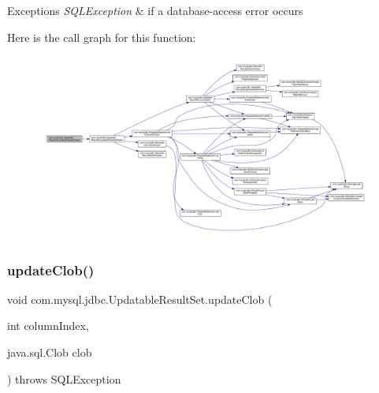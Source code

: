 \begin{DoxyExceptions}{Exceptions}
{\em S\+Q\+L\+Exception} & if a database-\/access error occurs \\
\hline
\end{DoxyExceptions}
Here is the call graph for this function\+:
\nopagebreak
\begin{figure}[H]
\begin{center}
\leavevmode
\includegraphics[width=350pt]{classcom_1_1mysql_1_1jdbc_1_1_updatable_result_set_aa40ad5cf67142d3dc3e3842fc16cda26_cgraph}
\end{center}
\end{figure}
\mbox{\label{classcom_1_1mysql_1_1jdbc_1_1_updatable_result_set_adc60deda2d478d5978e684d6efc77e4b}} 
\subsubsection{\texorpdfstring{update\+Clob()}{updateClob()}}
{\footnotesize\ttfamily void com.\+mysql.\+jdbc.\+Updatable\+Result\+Set.\+update\+Clob (\begin{DoxyParamCaption}\item[{int}]{column\+Index,  }\item[{java.\+sql.\+Clob}]{clob }\end{DoxyParamCaption}) throws S\+Q\+L\+Exception}

